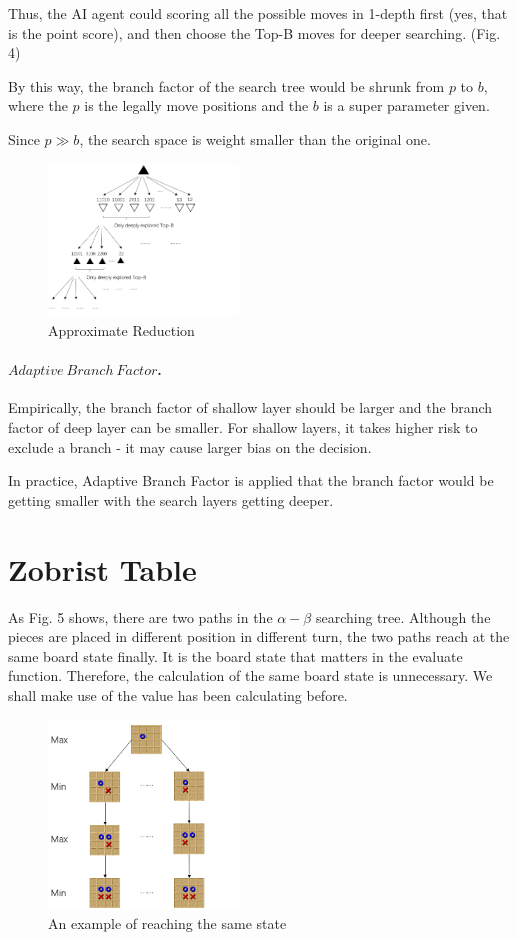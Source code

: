 \documentclass[final]{cvpr}
\newcommand{\mypara}[1]{\paragraph{#1.}}
\begin{document}
Thus, the AI agent could scoring all the possible moves in 1-depth first (yes, that is the point score), and then choose the Top-B moves for deeper searching.
 (Fig. 4)
%

By this way, the branch factor of the search tree would be shrunk from $p$ to $b$, where the $p$ is the legally move positions and the $b$ is a super parameter given.

%
Since $p \gg b$, the search space is weight smaller than the original one.
\begin{figure}[htbp]
\centering 
\includegraphics[width=0.45\textwidth]{figures/pic6.png} 
\caption{Approximate Reduction} 
\label{Fig.main3} %
\end{figure}

\mypara{$Adaptive\ Branch\ Factor$}

Empirically, the branch factor of shallow layer should be larger and the branch factor of deep layer can be smaller.
%
For shallow layers, it takes higher risk to exclude a branch - it may cause larger bias on the decision.

In practice, Adaptive Branch Factor is applied that the branch factor would be getting smaller with the search layers getting deeper.

\section{Zobrist Table}
As Fig. 5 shows, there are two paths in the $\alpha-\beta$ searching tree.
%
Although the pieces are placed in different position in different turn, 
the two paths reach at the same board state finally.
%
It is the board state that matters in the evaluate function.
%
Therefore, the calculation of the same board state is unnecessary.
%
We shall make use of the value has been calculating before.

\begin{figure}[htbp]
\centering 
\includegraphics[width=0.45\textwidth]{figures/pic2.png} 
\caption{An example of reaching the same state} 
\label{Fig.main4} %
\end{figure}
\end{document}
